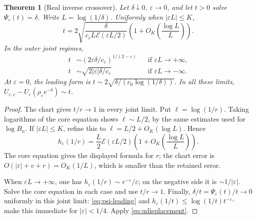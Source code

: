 \documentclass[11pt,a4paper]{article}
\numberwithin{equation}{section}
\newtheorem{theorem}{Theorem}[section]
\theoremstyle{definition}
\theoremstyle{remark}
\newcommand{\eps}{\varepsilon}
\newcommand{\cE}{\mathcal E}
\begin{document}
\begin{theorem}[Real inverse crossover]
\label{thm:inverse-window}
Let \(\delta\downarrow0\), \(\eps\to0\), and let \(t>0\) solve
\(\Psi_\eps(t)=\delta\). Write \(L=\log(1/\delta)\). Uniformly when
\(|\eps L|\le K\),
\begin{equation}
 t=2\sqrt{\frac{\delta}{c_\eps L\cE(\eps L/2)}}
       \left(1+O_K\left(\frac{\log L}{L}\right)\right).
 \label{eq:inverse-window}
\end{equation}
In the outer joint regimes,
\begin{align}
 t&\sim(2\eps\delta/c_\eps)^{1/(2-\eps)}
 &&\text{if }\eps L\to+\infty, \label{eq:inverse-positive}\\
 t&\sim\sqrt{2|\eps|\delta/c_\eps}
 &&\text{if }\eps L\to-\infty. \label{eq:inverse-negative}
\end{align}
At \(\eps=0\), the leading form is
\(t\sim2\sqrt{\delta/(c_0\log(1/\delta))}\). In all these limits,
\(U_{\eps,c}-U_\eps(\rho_\eps e^{-\delta})\sim t\).
\end{theorem}
\begin{proof}
The chart gives \(t/r\to1\) in every joint limit. Put
\(\ell=\log(1/r)\). Taking logarithms of the core equation shows
\(\ell\sim L/2\), by the same estimates used for \(\log B_n\). If
\(|\eps L|\le K\), refine this to
\(\ell=L/2+O_K(\log L)\). Hence
\[
 h_\eps(1/r)=\frac L2\cE(\eps L/2)
              \left(1+O_K\left(\frac{\log L}{L}\right)\right).
\]
The core equation gives the displayed formula for \(r\); the chart error is
\(O(|\eps|+v+r)=O_K(1/L)\), which is smaller than the retained error.

When \(\eps L\to+\infty\), one has
\(h_\eps(1/r)\sim r^{-\eps}/\eps\); on the negative side it is
\(\sim1/|\eps|\). Solve the core equation in each case and use \(t/r\to1\).
Finally, \(\delta/t=\Psi_\eps(t)/t\to0\) uniformly in this joint limit:
\eqref{eq:psi-leading} and
\(h_\eps(1/t)\le\log(1/t)t^{-\eps_+}\) make this immediate for
\(|\eps|<1/4\). Apply \eqref{eq:udisplacement}.
\end{proof}
\end{document}
